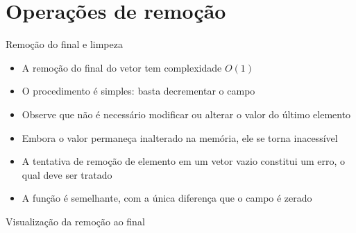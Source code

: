 \section{Operações de remoção}

\begin{frame}[fragile]{Remoção do final e limpeza}

    \begin{itemize}
        \item A remoção do final do vetor tem complexidade $O(1)$

        \item O procedimento é simples: basta decrementar o campo 

        \item Observe que não é necessário modificar ou alterar o valor do
        último elemento

        \item Embora o valor permaneça inalterado na memória, ele se torna inacessível

        \item A tentativa de remoção de elemento em um vetor vazio constitui um erro, o qual
            deve ser tratado

        \item A função  é semelhante, com a única diferença que o campo
         é zerado
    \end{itemize}

\end{frame}

\begin{frame}[fragile]{Visualização da remoção ao final}


\end{frame}


